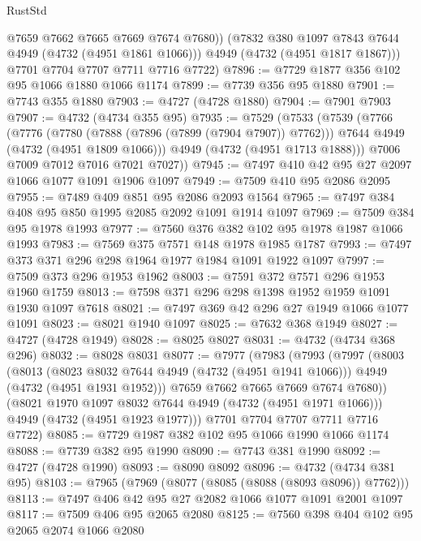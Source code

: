 \begin{lexlean}{RustStd}
\begin{coremodule}
            @7659
            @7662
            @7665
            @7669
            @7674
            @7680))
        (@7832 @380 @1097 @7843 @7644 @4949 (@4732 (@4951 @1861 @1066)))
        @4949
        (@4732 (@4951 @1817 @1867)))
      @7701
      @7704
      @7707
      @7711
      @7716
      @7722)
@7896 := @7729 @1877 @356 @102 @95 @1066 @1880 @1066 @1174
@7899 := @7739 @356 @95 @1880
@7901 := @7743 @355 @1880
@7903 := @4727 (@4728 @1880)
@7904 := @7901 @7903
@7907 := @4732 (@4734 @355 @95)
@7935 := @7529
    (@7533
      (@7539
        (@7766
          (@7776
            (@7780 (@7888 (@7896 (@7899 (@7904 @7907)) @7762)))
            @7644
            @4949
            (@4732 (@4951 @1809 @1066)))
          @4949
          (@4732 (@4951 @1713 @1888)))
        @7006
        @7009
        @7012
        @7016
        @7021
        @7027))
@7945 := @7497 @410 @42 @95 @27 @2097 @1066 @1077 @1091 @1906 @1097
@7949 := @7509 @410 @95 @2086 @2095
@7955 := @7489 @409 @851 @95 @2086 @2093 @1564
@7965 := @7497 @384 @408 @95 @850 @1995 @2085 @2092 @1091 @1914 @1097
@7969 := @7509 @384 @95 @1978 @1993
@7977 := @7560 @376 @382 @102 @95 @1978 @1987 @1066 @1993
@7983 := @7569 @375 @7571 @148 @1978 @1985 @1787
@7993 := @7497 @373 @371 @296 @298 @1964 @1977 @1984 @1091 @1922 @1097
@7997 := @7509 @373 @296 @1953 @1962
@8003 := @7591 @372 @7571 @296 @1953 @1960 @1759
@8013 := @7598 @371 @296 @298 @1398 @1952 @1959 @1091 @1930 @1097 @7618
@8021 := @7497 @369 @42 @296 @27 @1949 @1066 @1077 @1091
@8023 := @8021 @1940 @1097
@8025 := @7632 @368 @1949
@8027 := @4727 (@4728 @1949)
@8028 := @8025 @8027
@8031 := @4732 (@4734 @368 @296)
@8032 := @8028 @8031
@8077 := @7977
    (@7983
      (@7993
        (@7997
          (@8003
            (@8013
              (@8023 @8032 @7644 @4949 (@4732 (@4951 @1941 @1066)))
              @4949
              (@4732 (@4951 @1931 @1952)))
            @7659
            @7662
            @7665
            @7669
            @7674
            @7680))
        (@8021 @1970 @1097 @8032 @7644 @4949 (@4732 (@4951 @1971 @1066)))
        @4949
        (@4732 (@4951 @1923 @1977)))
      @7701
      @7704
      @7707
      @7711
      @7716
      @7722)
@8085 := @7729 @1987 @382 @102 @95 @1066 @1990 @1066 @1174
@8088 := @7739 @382 @95 @1990
@8090 := @7743 @381 @1990
@8092 := @4727 (@4728 @1990)
@8093 := @8090 @8092
@8096 := @4732 (@4734 @381 @95)
@8103 := @7965 (@7969 (@8077 (@8085 (@8088 (@8093 @8096)) @7762)))
@8113 := @7497 @406 @42 @95 @27 @2082 @1066 @1077 @1091 @2001 @1097
@8117 := @7509 @406 @95 @2065 @2080
@8125 := @7560 @398 @404 @102 @95 @2065 @2074 @1066 @2080

\end{coremodule}
\end{lexlean}
